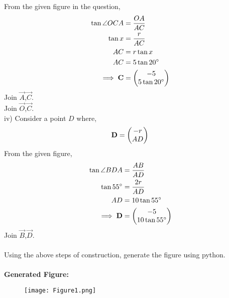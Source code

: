 \documentclass[journal,12pt,twocolumn]{IEEEtran}
\begin{document}
From the given figure in the question,
\begin{align}
\tan \angle OCA&=\frac{OA}{AC}\\
\tan x&=\frac{r}{AC}\\
AC&=r\tan x\\
AC&=5\tan 20^\circ\\
\implies \mathbf C&=\begin{pmatrix}-5\\5\tan 20^\circ\end{pmatrix}
\end{align}
Join $\vec A$,$\vec C$.\\
Join $\vec O$,$\vec C$.\\
iv) 
Consider a point $D$ where,\\
\begin{equation}
\mathbf D=\begin{pmatrix}-r\\AD\end{pmatrix}\\
\end{equation}
From the given figure,
\begin{align}
\tan \angle BDA&=\frac{AB}{AD}\\
\tan 55^\circ&=\frac{2r}{AD}\\
AD&=10\tan 55^\circ \\
\implies \mathbf D &=\begin{pmatrix}-5\\10\tan55^\circ\end{pmatrix}
\end{align}
Join $\vec B$,$\vec D$.\\\\
Using the above steps of construction, generate the figure using python.\\\\
\textbf{Generated Figure:}
\begin{figure}[h]
    \centering
    \texttt{[image: Figure1.png]}
\end{figure}
 
\end{document}

